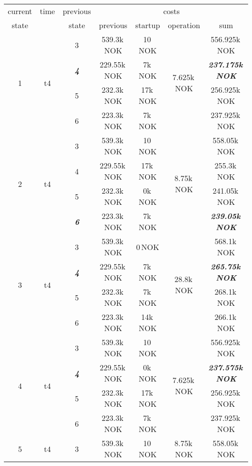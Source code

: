 \documentclass{article}
\begin{document}
	\begin{table}[hbt!]
\begin{center}
\begin{tabular}[h]{|c|c|c||c|c|c||c|}
\hline
current & time & previous   & \multicolumn{4}{|c|}{costs}\\
\cline{4-7}
state  		&      	&  state    &   previous    	&    startup   		& operation 		&  sum \\
\hline
\hline
\multirow{4}{*}{1} & \multirow{4}{*}{t4}	
	&	3		&		539.3k\,NOK			&	10\,NOK			&	\multirow{4}{*}{7.625k\,NOK}		&	556.925k\,NOK\\
&	&	\textit{\textbf{4}}		&		229.55k\,NOK		&	7k\,NOK			&					&	\textit{\textbf{237.175k\,NOK}}\\
&	&	5		&		232.3k\,NOK			&	17k\,NOK		&										&	256.925k\,NOK\\
&	&	6		&		223.3k\,NOK			&	7k\,NOK			&										&	237.925k\,NOK\\
\hline
\multirow{4}{*}{2} & \multirow{4}{*}{t4}	
	&	3		&		539.3k\,NOK			&	10\,NOK			&	\multirow{4}{*}{8.75k\,NOK}		&	558.05k\,NOK\\
&	&	4		&		229.55k\,NOK		&	17k\,NOK		&										&	255.3k\,NOK\\
&	&	5		&		232.3k\,NOK			&	0k\,NOK			&										&	241.05k\,NOK\\
&	&	\textit{\textbf{6}}		&		223.3k\,NOK			&	7k\,NOK			&					&	\textit{\textbf{239.05k\,NOK}}\\
\hline
\multirow{4}{*}{3} & \multirow{4}{*}{t4}	
	&	3		&		539.3k\,NOK			&	0\,NOK			&	\multirow{4}{*}{28.8k\,NOK}		&	568.1k\,NOK\\
&	&	\textit{\textbf{4}}		&		229.55k\,NOK		&	7k\,NOK			&					&	\textit{\textbf{265.75k\,NOK}}\\
&	&	5		&		232.3k\,NOK			&	7k\,NOK			&										&	268.1k\,NOK\\
&	&	6		&		223.3k\,NOK			&	14k\,NOK		&										&	266.1k\,NOK\\
\hline
\multirow{4}{*}{4} & \multirow{4}{*}{t4}	
	&	3		&		539.3k\,NOK			&	10\,NOK			&	\multirow{4}{*}{7.625k\,NOK}		&	556.925k\,NOK\\
&	&	\textit{\textbf{4}}		&		229.55k\,NOK		&	0k\,NOK			&					&	\textit{\textbf{237.575k\,NOK}}\\
&	&	5		&		232.3k\,NOK			&	17k\,NOK		&										&	256.925k\,NOK\\
&	&	6		&		223.3k\,NOK			&	7k\,NOK			&										&	237.925k\,NOK\\
\hline
\multirow{4}{*}{5} & \multirow{4}{*}{t4}	
	&	3		&		539.3k\,NOK			&	10\,NOK			&	\multirow{4}{*}{8.75k\,NOK}		&	558.05k\,NOK\\

\end{tabular}
\end{center}
\end{table}
\end{document}
